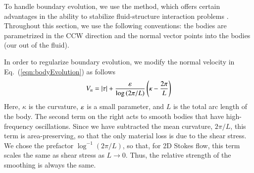 \documentclass[preprint, 10pt]{elsarticle}
\begin{document}
To handle boundary evolution, we use the {\thL}    method, which offers certain advantages in the ability to stabilize fluid-structure interaction problems \cite{hou-low-she1994}. Throughout this section, we use the following conventions: the bodies are parametrized in the CCW direction and the normal vector points into the bodies (our out of the fluid).

In order to regularize boundary evolution, we modify the normal velocity in Eq.~(\ref{eqn:bodyEvolution}) as follows
\begin{equation}
\label{eqn:Vn}
V_n = \lvert \tau \rvert + \frac{\varepsilon}{\log \left(2\pi/L \right)} \left(\kappa - \frac{2 \pi}{L} \right)
\end{equation}
Here, $\kappa$ is the curvature, $\varepsilon$ is a small parameter, and $L$ is the total arc length of the body. The second term on the right acts to smooth bodies that have high-frequency oscillations. Since we have subtracted the mean curvature, $2\pi/L$, this term is area-preserving, so that the only material loss is due to the shear stress. We chose the prefactor $\log^{-1} \left(2\pi/L \right)$, so that, for 2D Stokes flow, this term scales the same as shear stress as $L \to 0$. Thus, the relative strength of the smoothing is always the same. 
\end{document}

